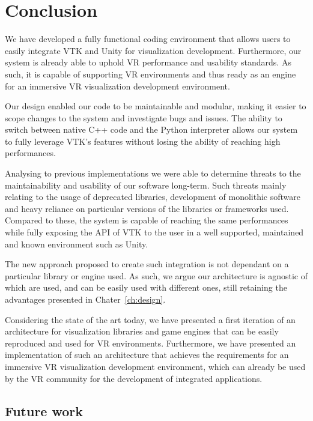 \chapter{Conclusion}
\label{ch:conclusion}

We have developed a fully functional coding environment that allows users to easily integrate VTK and Unity for visualization development. Furthermore, our system is already able to uphold VR performance and usability standards. As such, it is capable of supporting VR environments and thus ready as an engine for an immersive VR visualization development environment.

Our design enabled our code to be maintainable and modular, making it easier to scope changes to the system and investigate bugs and issues. The ability to switch between native C++ code and the Python interpreter allows our system to fully leverage VTK's features without losing the ability of reaching high performances.

Analysing to previous implementations we were able to determine threats to the maintainability and usability of our software long-term. Such threats mainly relating to the usage of deprecated libraries, development of monolithic software and heavy reliance on particular versions of the libraries or frameworks used. Compared to these, the system is capable of reaching the same performances while fully exposing the API of VTK to the user in a well supported, maintained and known environment such as Unity.

The new approach proposed to create such integration is not dependant on a particular library or engine used. As such, we argue our architecture is agnostic of which are used, and can be easily used with different ones, still retaining the advantages presented in Chater~\ref{ch:design}.

Considering the state of the art today, we have presented a first iteration of an architecture for visualization libraries and game engines that can be easily reproduced and used for VR environments. Furthermore, we have presented an implementation of such an architecture that achieves the requirements for an immersive VR visualization development environment, which can already be used by the VR community for the development of integrated applications.

\section{Future work}
\label{sec:future_work}


